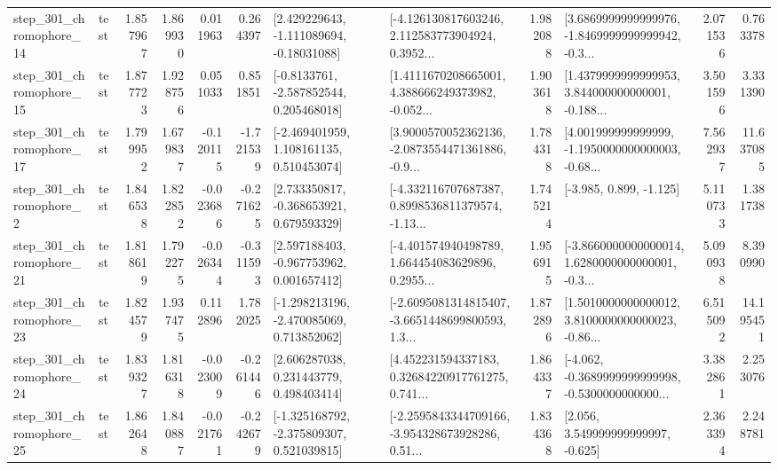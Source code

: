 \begin{tabular}{llrrrrllrlrr}
  step\_301\_chromophore\_14 &      test &      1.857967 &    1.869930 &      0.011963 &  0.264397 &    [2.429229643, -1.111089694, -0.18031088] &  [-4.126130817603246, 2.112583773904924, 0.3952... &       1.982088 &  [3.6869999999999976, -1.8469999999999942, -0.3... &            2.071536 &          0.763378 \\
  step\_301\_chromophore\_15 &      test &      1.877723 &    1.928756 &      0.051033 &  0.851851 &     [-0.8133761, -2.587852544, 0.205468018] &  [1.4111670208665001, 4.388666249373982, -0.052... &       1.903618 &  [1.4379999999999953, 3.844000000000001, -0.188... &            3.501596 &          3.331390 \\
  step\_301\_chromophore\_17 &      test &      1.799952 &    1.679837 &     -0.120115 & -1.721539 &    [-2.469401959, 1.108161135, 0.510453074] &  [3.9000570052362136, -2.0873554471361886, -0.9... &       1.784318 &  [4.001999999999999, -1.1950000000000003, -0.68... &            7.562937 &         11.637085 \\
   step\_301\_chromophore\_2 &      test &      1.846538 &    1.822852 &     -0.023686 & -0.271625 &    [2.733350817, -0.368653921, 0.679593329] &  [-4.332116707687387, 0.8998536811379574, -1.13... &       1.745214 &                            [-3.985, 0.899, -1.125] &            5.110733 &          1.381738 \\
  step\_301\_chromophore\_21 &      test &      1.818619 &    1.792275 &     -0.026344 & -0.311593 &    [2.597188403, -0.967753962, 0.001657412] &  [-4.401574940498789, 1.664454083629896, 0.2955... &       1.956915 &  [-3.8660000000000014, 1.6280000000000001, -0.3... &            5.090938 &          8.390990 \\
  step\_301\_chromophore\_23 &      test &      1.824579 &    1.937475 &      0.112896 &  1.782025 &   [-1.298213196, -2.470085069, 0.713852062] &  [-2.6095081314815407, -3.6651448699800593, 1.3... &       1.872896 &  [1.5010000000000012, 3.8100000000000023, -0.86... &            6.515092 &         14.195451 \\
  step\_301\_chromophore\_24 &      test &      1.839327 &    1.816318 &     -0.023009 & -0.261446 &     [2.606287038, 0.231443779, 0.498403414] &  [4.452231594337183, 0.32684220917761275, 0.741... &       1.864337 &  [-4.062, -0.3689999999999998, -0.5300000000000... &            3.382861 &          2.253076 \\
  step\_301\_chromophore\_25 &      test &      1.862648 &    1.840887 &     -0.021761 & -0.242679 &   [-1.325168792, -2.375809307, 0.521039815] &  [-2.2595843344709166, -3.954328673928286, 0.51... &       1.834368 &                 [2.056, 3.549999999999997, -0.625] &            2.363394 &          2.248781 \\

\end{tabular}
